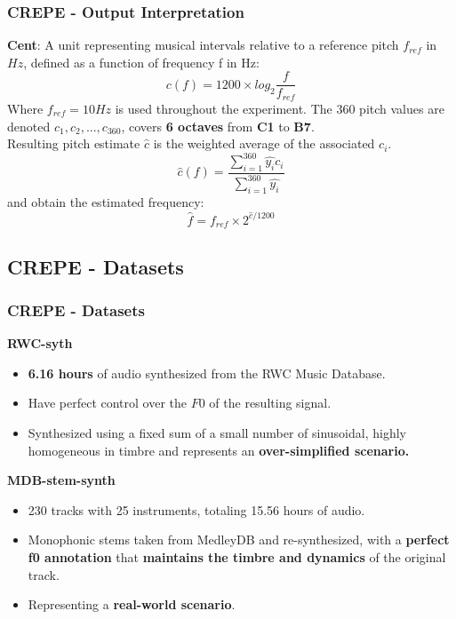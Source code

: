 \documentclass{beamer}
\begin{document}
\begin{frame}
\frametitle{CREPE - Output Interpretation}
\textbf{Cent}: A unit representing musical intervals relative to a reference pitch $f_{ref}$ in $Hz$, defined as a function of frequency f in Hz:
\begin{equation}
    c(f) = 1200 \times log_2 \frac{f}{f_{ref}} 
\end{equation}
Where $f_{ref} = 10Hz$ is used throughout the experiment. The 360 pitch values are denoted $c_1, c_2, ..., c_{360}$, covers \textbf{6 octaves} from \textbf{C1} to \textbf{B7}. \\
Resulting pitch estimate $\hat{c}$ is the weighted average of the associated $c_i$.
\begin{equation}
    \hat{c}(f) = \frac{\sum_{i=1}^{360}\hat{y_i}c_i}{\sum_{i=1}^{360}\hat{y_i}}
\end{equation}
and obtain the estimated frequency:
\begin{equation}
    \hat{f} = f_{ref}\times 2^{\hat{c}/1200}
\end{equation}
\end{frame}


\subsection{CREPE - Datasets}
\begin{frame}
\frametitle{CREPE - Datasets}
\textbf{RWC-syth}
\begin{itemize}
\item \textbf{6.16 hours} of audio synthesized from the RWC Music Database.
\item Have perfect control over the $F0$ of the resulting signal.
\item Synthesized using a fixed sum of a small number of sinusoidal, highly homogeneous in timbre and represents an \textbf{over-simplified scenario.}
\end{itemize}
\textbf{MDB-stem-synth}
\begin{itemize}
\item 230 tracks with 25 instruments, totaling 15.56 hours of audio.
\item Monophonic stems taken from MedleyDB and re-synthesized, with a \textbf{perfect f0 annotation} that \textbf{maintains the timbre and dynamics} of the original track.
\item Representing a \textbf{real-world scenario}.
\end{itemize}
\end{frame}
\end{document}

